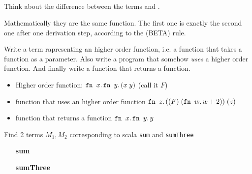 \subsection{}

Think about the difference between the terms  and
.

Mathematically they are the same function. The first one is exactly
the second one after one derivation step, according to the (BETA)
rule.

Write a term rapresenting an higher order function, i.e. a function
that takes a function as a parameter. Also write a program that
somehow \textit{uses} a higher order function. And finally write a
function that returns a function.

\begin{itemize}
\item Higher order function: \(\texttt{fn }x.\,\texttt{fn }y.\,(x\;y)\) (call it
  \(F\))
\item function that uses an higher order function
  \(\texttt{fn }z.\,((F)\;(\texttt{fn }w.\,w+2))\;(z)\)
\item function that returns a function \(\texttt{fn }x.\,\texttt{fn }y.\,y\)
\end{itemize}

Find 2 terms \(M_1, M_2\) corresponding to scala \texttt{sum} and
\texttt{sumThree}

\begin{itemize}
\item[\textbf{sum}]      
\item[\textbf{sumThree}] 
\end{itemize}
